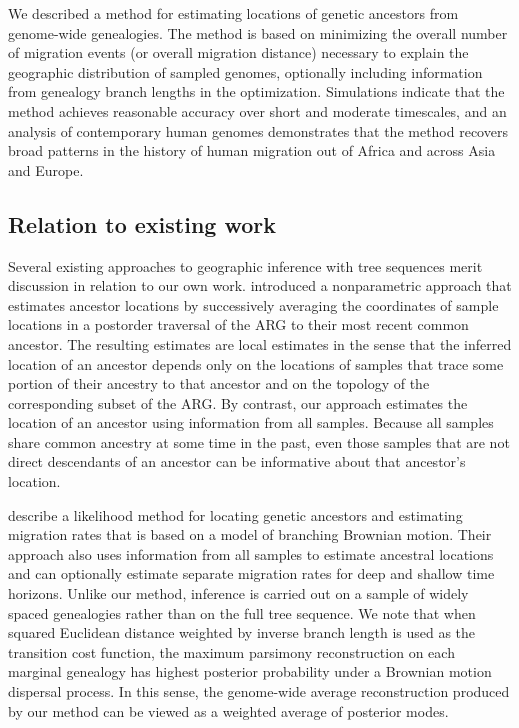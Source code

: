 We described a method for estimating locations of genetic ancestors from 
genome-wide genealogies. The method is based on minimizing the overall number 
of migration events (or overall migration distance) necessary to explain the 
geographic distribution of sampled genomes, optionally including information 
from genealogy branch lengths in the optimization. Simulations indicate that 
the method achieves reasonable accuracy over short and moderate timescales, and 
an analysis of contemporary human genomes demonstrates that the method recovers 
broad patterns in the history of human migration out of Africa and across Asia 
and Europe.

\subsection{Relation to existing work}

Several existing approaches to geographic inference with tree sequences merit 
discussion in relation to our own work. \citet{Wohns_etal_2022} introduced a
nonparametric approach that estimates ancestor locations by successively
averaging the coordinates of sample locations in a postorder traversal of the
ARG to their most recent common ancestor. The resulting estimates are local 
estimates in the sense that the inferred location of an ancestor depends only 
on the locations of samples that trace some portion of their ancestry to that 
ancestor and on the topology of the corresponding subset of the ARG. By contrast,
our approach estimates the location of an ancestor using information from all
samples. Because all samples share common ancestry at some time in the past, 
even those samples that are not direct descendants of an ancestor can be 
informative about that ancestor's location.

\citet{Osmond_Coop_2021} describe a likelihood method for locating genetic
ancestors and estimating migration rates that is based on a model of branching
Brownian motion. Their approach also uses information from all samples to
estimate ancestral locations and can optionally estimate separate migration
rates for deep and shallow time horizons. Unlike our method, inference is 
carried out on a sample of widely spaced genealogies rather than on the full 
tree sequence. We note that when squared Euclidean distance weighted by inverse 
branch length is used as the transition cost function, the maximum parsimony 
reconstruction on each marginal genealogy has highest posterior probability 
under a Brownian motion dispersal process. In this sense, the genome-wide 
average reconstruction produced by our method can be viewed as a weighted 
average of posterior modes.

